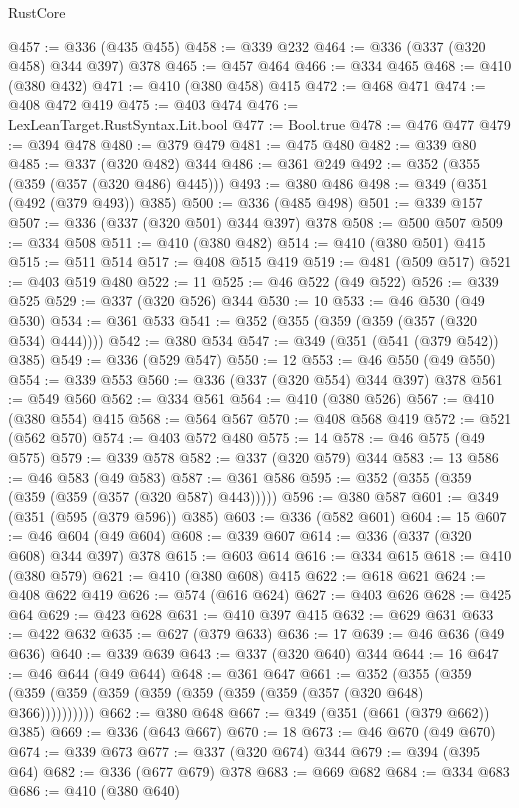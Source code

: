 \begin{lexlean}{RustCore}
\begin{coremodule}
@457 := @336 (@435 @455)
@458 := @339 @232
@464 := @336 (@337 (@320 @458) @344 @397) @378
@465 := @457 @464
@466 := @334 @465
@468 := @410 (@380 @432)
@471 := @410 (@380 @458) @415
@472 := @468 @471
@474 := @408 @472 @419
@475 := @403 @474
@476 := LexLeanTarget.RustSyntax.Lit.bool
@477 := Bool.true
@478 := @476 @477
@479 := @394 @478
@480 := @379 @479
@481 := @475 @480
@482 := @339 @80
@485 := @337 (@320 @482) @344
@486 := @361 @249
@492 := @352 (@355 (@359 (@357 (@320 @486) @445)))
@493 := @380 @486
@498 := @349 (@351 (@492 (@379 @493)) @385)
@500 := @336 (@485 @498)
@501 := @339 @157
@507 := @336 (@337 (@320 @501) @344 @397) @378
@508 := @500 @507
@509 := @334 @508
@511 := @410 (@380 @482)
@514 := @410 (@380 @501) @415
@515 := @511 @514
@517 := @408 @515 @419
@519 := @481 (@509 @517)
@521 := @403 @519 @480
@522 := 11
@525 := @46 @522 (@49 @522)
@526 := @339 @525
@529 := @337 (@320 @526) @344
@530 := 10
@533 := @46 @530 (@49 @530)
@534 := @361 @533
@541 := @352 (@355 (@359 (@359 (@357 (@320 @534) @444))))
@542 := @380 @534
@547 := @349 (@351 (@541 (@379 @542)) @385)
@549 := @336 (@529 @547)
@550 := 12
@553 := @46 @550 (@49 @550)
@554 := @339 @553
@560 := @336 (@337 (@320 @554) @344 @397) @378
@561 := @549 @560
@562 := @334 @561
@564 := @410 (@380 @526)
@567 := @410 (@380 @554) @415
@568 := @564 @567
@570 := @408 @568 @419
@572 := @521 (@562 @570)
@574 := @403 @572 @480
@575 := 14
@578 := @46 @575 (@49 @575)
@579 := @339 @578
@582 := @337 (@320 @579) @344
@583 := 13
@586 := @46 @583 (@49 @583)
@587 := @361 @586
@595 := @352 (@355 (@359 (@359 (@359 (@357 (@320 @587) @443)))))
@596 := @380 @587
@601 := @349 (@351 (@595 (@379 @596)) @385)
@603 := @336 (@582 @601)
@604 := 15
@607 := @46 @604 (@49 @604)
@608 := @339 @607
@614 := @336 (@337 (@320 @608) @344 @397) @378
@615 := @603 @614
@616 := @334 @615
@618 := @410 (@380 @579)
@621 := @410 (@380 @608) @415
@622 := @618 @621
@624 := @408 @622 @419
@626 := @574 (@616 @624)
@627 := @403 @626
@628 := @425 @64
@629 := @423 @628
@631 := @410 @397 @415
@632 := @629 @631
@633 := @422 @632
@635 := @627 (@379 @633)
@636 := 17
@639 := @46 @636 (@49 @636)
@640 := @339 @639
@643 := @337 (@320 @640) @344
@644 := 16
@647 := @46 @644 (@49 @644)
@648 := @361 @647
@661 := @352 (@355 (@359 (@359 (@359 (@359 (@359 (@359 (@359 (@359 (@357 (@320 @648) @366))))))))))
@662 := @380 @648
@667 := @349 (@351 (@661 (@379 @662)) @385)
@669 := @336 (@643 @667)
@670 := 18
@673 := @46 @670 (@49 @670)
@674 := @339 @673
@677 := @337 (@320 @674) @344
@679 := @394 (@395 @64)
@682 := @336 (@677 @679) @378
@683 := @669 @682
@684 := @334 @683
@686 := @410 (@380 @640)

\end{coremodule}
\end{lexlean}

